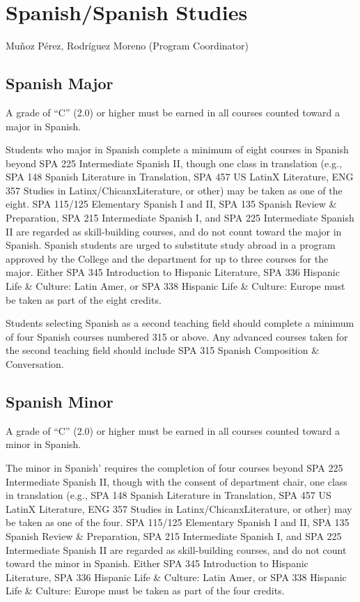 \documentclass[
  letterpaper,
]{scrbook}
\begin{document}
\section{Spanish/Spanish Studies}\label{spanishspanish-studies}

Muñoz Pérez, Rodríguez Moreno (Program Coordinator)

\subsection{Spanish Major}\label{spanish-major}

A grade of ``C'' (2.0) or higher must be earned in all courses counted
toward a major in Spanish.

Students who major in Spanish complete a minimum of eight courses in
Spanish beyond SPA 225 Intermediate Spanish II, though one class in
translation (e.g., SPA 148 Spanish Literature in Translation, SPA 457 US
LatinX Literature, ENG 357 Studies in Latinx/ChicanxLiterature, or
other) may be taken as one of the eight. SPA 115/125 Elementary Spanish
I and II, SPA 135 Spanish Review \& Preparation, SPA 215 Intermediate
Spanish I, and SPA 225 Intermediate Spanish II are regarded as
skill-building courses, and do not count toward the major in Spanish.
Spanish students are urged to substitute study abroad in a program
approved by the College and the department for up to three courses for
the major. Either SPA 345 Introduction to Hispanic Literature, SPA 336
Hispanic Life \& Culture: Latin Amer, or SPA 338 Hispanic Life \&
Culture: Europe must be taken as part of the eight credits.

Students selecting Spanish as a second teaching field should complete a
minimum of four Spanish courses numbered 315 or above. Any advanced
courses taken for the second teaching field should include SPA 315
Spanish Composition \& Conversation.

\subsection{Spanish Minor}\label{spanish-minor}

A grade of ``C'' (2.0) or higher must be earned in all courses counted
toward a minor in Spanish.

The minor in Spanish' requires the completion of four courses beyond SPA
225 Intermediate Spanish II, though with the consent of department
chair, one class in translation (e.g., SPA 148 Spanish Literature in
Translation, SPA 457 US LatinX Literature, ENG 357 Studies in
Latinx/ChicanxLiterature, or other) may be taken as one of the four. SPA
115/125 Elementary Spanish I and II, SPA 135 Spanish Review \&
Preparation, SPA 215 Intermediate Spanish I, and SPA 225 Intermediate
Spanish II are regarded as skill-building courses, and do not count
toward the minor in Spanish. Either SPA 345 Introduction to Hispanic
Literature, SPA 336 Hispanic Life \& Culture: Latin Amer, or SPA 338
Hispanic Life \& Culture: Europe must be taken as part of the four
credits.
\end{document}
